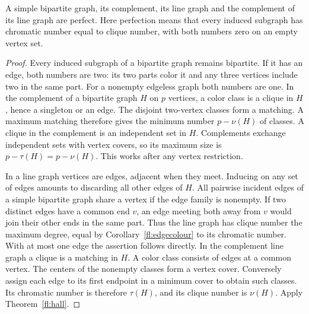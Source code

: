 \begin{corollary}\leavevmode\label{fl:perfect}
A simple bipartite graph, its complement, its line graph and the
complement of its line graph are perfect. Here perfection means that
every induced subgraph has chromatic number equal to clique number,
with both numbers zero on an empty vertex set.
\end{corollary}
\begin{proof}
Every induced subgraph of a bipartite graph remains bipartite.
If it has an edge, both numbers are two: its two parts color it
and any three vertices include two in the same part. For a nonempty
edgeless graph both numbers are one. In the complement of a bipartite
graph $H$ on $p$ vertices, a color class is a clique in $H$, hence
a singleton or an edge. The disjoint two-vertex classes form a matching.
A maximum matching therefore gives the minimum number $p-\nu(H)$ of
classes. A clique in the complement is an independent set in $H$.
Complements exchange independent sets with vertex covers, so its
maximum size is $p-\tau(H)=p-\nu(H)$. This works after any vertex
restriction.

In a line graph vertices are edges, adjacent when they meet. Inducing
on any set of edges amounts to discarding all other edges of $H$.
All pairwise incident edges of a simple bipartite graph share a
vertex if the edge family is nonempty. If two distinct edges have a common
end $v$, an edge meeting both away from $v$ would join their other ends
in the same part. Thus the line graph has clique number the maximum
degree, equal by Corollary~\ref{fl:edgecolour} to its chromatic number.
With at most one edge the assertion follows directly. In the complement
line graph a clique is a matching in $H$. A color class consists of
edges at a common vertex. The centers of the nonempty classes form a
vertex cover. Conversely assign each edge to its first endpoint in a
minimum cover to obtain such classes. Its chromatic number is therefore
$\tau(H)$, and its clique number is $\nu(H)$. Apply
Theorem~\ref{fl:hall}.
\end{proof}

